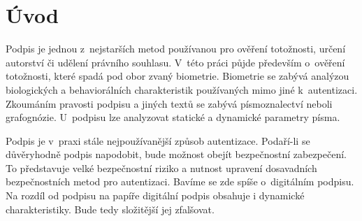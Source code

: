 
%

\chapter{Úvod}
Podpis je jednou z~nejstarších metod používanou pro ověření totožnosti, určení autorství či udělení právního souhlasu.
V~této práci půjde především o~ověření totožnosti, které spadá pod obor zvaný biometrie.
Biometrie se zabývá analýzou biologických a behaviorálních charakteristik používaných mimo jiné k~autentizaci. 
Zkoumáním pravosti podpisu a jiných textů se zabývá písmoznalectví neboli grafognózie.
U~podpisu lze analyzovat statické a dynamické parametry písma. 

Podpis je v~praxi stále nejpoužívanější způsob autentizace. 
Podaří-li se důvěryhodně podpis napodobit, bude možnost obejít bezpečnostní zabezpečení. 
To představuje velké bezpečnostní riziko a nutnost upravení dosavadních bezpečnostních metod pro autentizaci. 
Bavíme se zde spíše o~digitálním podpisu. 
Na rozdíl od podpisu na papíře digitální podpis obsahuje i dynamické charakteristiky.
Bude tedy složitější jej zfalšovat.





